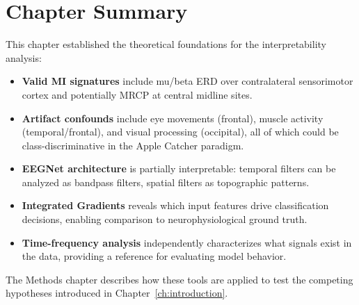 \section{Chapter Summary}
\label{sec:bg_summary}

This chapter established the theoretical foundations for the interpretability analysis:

\begin{itemize}
    \item \textbf{Valid MI signatures} include mu/beta ERD over contralateral sensorimotor cortex and potentially MRCP at central midline sites.
    
    \item \textbf{Artifact confounds} include eye movements (frontal), muscle activity (temporal/frontal), and visual processing (occipital), all of which could be class-discriminative in the Apple Catcher paradigm.
    
    \item \textbf{EEGNet architecture} is partially interpretable: temporal filters can be analyzed as bandpass filters, spatial filters as topographic patterns.
    
    \item \textbf{Integrated Gradients} reveals which input features drive classification decisions, enabling comparison to neurophysiological ground truth.
    
    \item \textbf{Time-frequency analysis} independently characterizes what signals exist in the data, providing a reference for evaluating model behavior.
\end{itemize}

The Methods chapter describes how these tools are applied to test the competing hypotheses introduced in Chapter~\ref{ch:introduction}.



